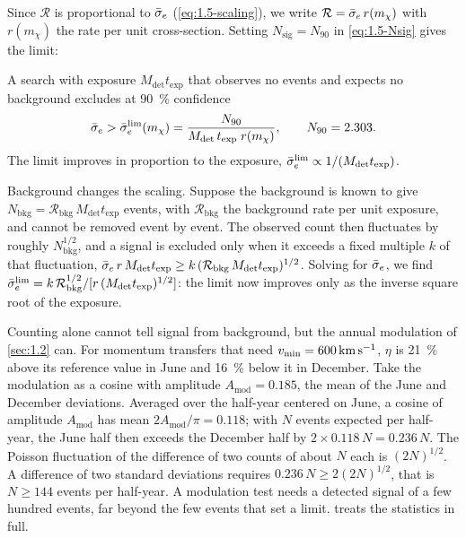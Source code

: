 Since $\mathcal{R}$ is proportional to $\bar{\sigma}_{e}$ (\cref{eq:1.5-scaling}), we write $\mathcal{R} = \bar{\sigma}_{e}\,r(m_\chi)$ with $r(m_\chi)$ the rate per unit cross-section. Setting $N_{\mathrm{sig}} = N_{90}$ in \cref{eq:1.5-Nsig} gives the limit:

\begin{keyresult}
A search with exposure $M_{\mathrm{det}}t_{\mathrm{exp}}$ that observes no events and expects no background excludes at \SI{90}{\percent} confidence
\begin{equation}
  \bar{\sigma}_{e} > \bar{\sigma}_{e}^{\mathrm{lim}}(m_\chi) = \frac{N_{90}}{M_{\mathrm{det}}\,t_{\mathrm{exp}}\; r(m_\chi)}, \qquad N_{90} = 2.303 .
  \label{eq:1.5-limit}
\end{equation}
The limit improves in proportion to the exposure, $\bar{\sigma}_{e}^{\mathrm{lim}} \propto 1/(M_{\mathrm{det}}t_{\mathrm{exp}})$.
\end{keyresult}

Background changes the scaling. Suppose the background is known to give $N_{\mathrm{bkg}} = \mathcal{R}_{\mathrm{bkg}}\,M_{\mathrm{det}}t_{\mathrm{exp}}$ events, with $\mathcal{R}_{\mathrm{bkg}}$ the background rate per unit exposure, and cannot be removed event by event. The observed count then fluctuates by roughly $N_{\mathrm{bkg}}^{1/2}$, and a signal is excluded only when it exceeds a fixed multiple $k$ of that fluctuation, $\bar{\sigma}_{e}\,r\,M_{\mathrm{det}}t_{\mathrm{exp}} \ge k\,(\mathcal{R}_{\mathrm{bkg}}\,M_{\mathrm{det}}t_{\mathrm{exp}})^{1/2}$. Solving for $\bar{\sigma}_{e}$, we find $\bar{\sigma}_{e}^{\mathrm{lim}} = k\,\mathcal{R}_{\mathrm{bkg}}^{1/2}/[r\,(M_{\mathrm{det}}t_{\mathrm{exp}})^{1/2}]$: the limit now improves only as the inverse square root of the exposure.

Counting alone cannot tell signal from background, but the annual modulation of \cref{sec:1.2} can. For momentum transfers that need $v_{\mathrm{min}} = \SI{600}{km.s^{-1}}$, $\eta$ is \SI{21}{\percent} above its reference value in June and \SI{16}{\percent} below it in December. Take the modulation as a cosine with amplitude $A_{\mathrm{mod}} = 0.185$, the mean of the June and December deviations. Averaged over the half-year centered on June, a cosine of amplitude $A_{\mathrm{mod}}$ has mean $2A_{\mathrm{mod}}/\pi = 0.118$; with $N$ events expected per half-year, the June half then exceeds the December half by $2 \times 0.118\,N = 0.236\,N$. The Poisson fluctuation of the difference of two counts of about $N$ each is $(2N)^{1/2}$. A difference of two standard deviations requires $0.236\,N \ge 2(2N)^{1/2}$, that is $N \ge 144$ events per half-year. A modulation test needs a detected signal of a few hundred events, far beyond the few events that set a limit.  treats the statistics in full.

